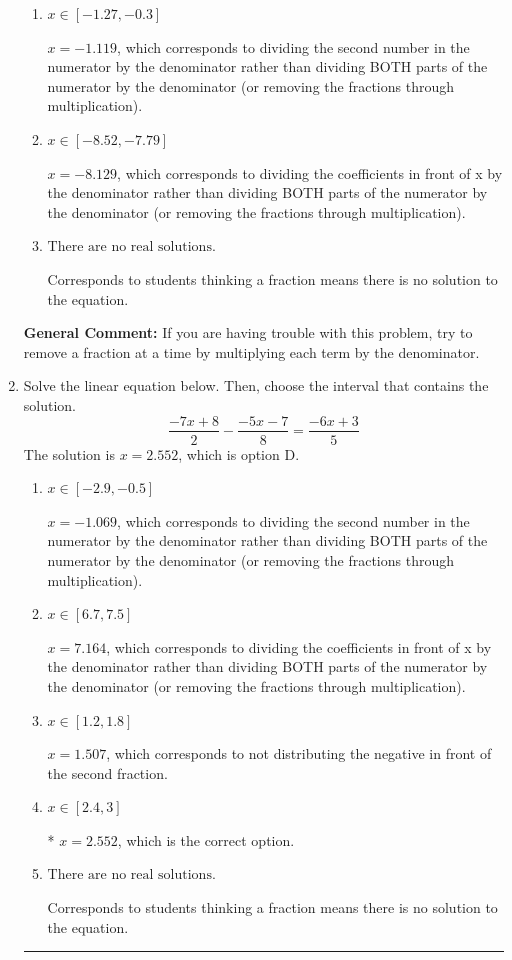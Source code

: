 \documentclass{extbook}[14pt]
\newcommand{\litem}[1]{\item #1

\rule{\textwidth}{0.4pt}}
\begin{document}
\begin{enumerate}
{\begin{enumerate}[label=\Alph*.]
* $x = -3.032$, which is the correct option.
\item \( x \in [-1.27, -0.3] \)

 $x = -1.119$, which corresponds to dividing the second number in the numerator by the denominator rather than dividing BOTH parts of the numerator by the denominator (or removing the fractions through multiplication).
\item \( x \in [-8.52, -7.79] \)

 $x = -8.129$, which corresponds to dividing the coefficients in front of x by the denominator rather than dividing BOTH parts of the numerator by the denominator (or removing the fractions through multiplication).
\item \( \text{There are no real solutions.} \)

Corresponds to students thinking a fraction means there is no solution to the equation.
\end{enumerate}

\textbf{General Comment:} If you are having trouble with this problem, try to remove a fraction at a time by multiplying each term by the denominator.
}
\litem{
Solve the linear equation below. Then, choose the interval that contains the solution.
\[ \frac{-7x + 8}{2} - \frac{-5x -7}{8} = \frac{-6x + 3}{5} \]The solution is \( x = 2.552 \), which is option D.\begin{enumerate}[label=\Alph*.]
\item \( x \in [-2.9, -0.5] \)

 $x = -1.069$, which corresponds to dividing the second number in the numerator by the denominator rather than dividing BOTH parts of the numerator by the denominator (or removing the fractions through multiplication).
\item \( x \in [6.7, 7.5] \)

 $x = 7.164$, which corresponds to dividing the coefficients in front of x by the denominator rather than dividing BOTH parts of the numerator by the denominator (or removing the fractions through multiplication).
\item \( x \in [1.2, 1.8] \)

 $x = 1.507$, which corresponds to not distributing the negative in front of the second fraction.
\item \( x \in [2.4, 3] \)

* $x = 2.552$, which is the correct option.
\item \( \text{There are no real solutions.} \)

Corresponds to students thinking a fraction means there is no solution to the equation.
\end{enumerate}

}
\end{enumerate}
\end{document}
